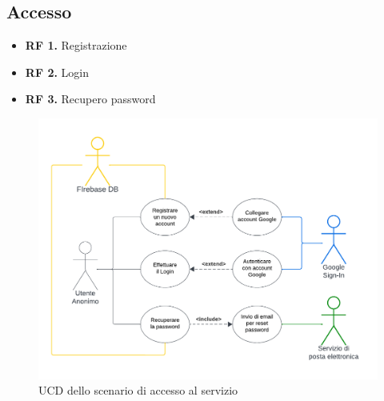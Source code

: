 \documentclass[11pt, a4paper]{article}
\theoremstyle{definition} %
\begin{document}
\subsection{Accesso}
\begin{itemize}
    \item \textbf{RF 1.} Registrazione
    \item \textbf{RF 2.} Login
    \item \textbf{RF 3.} Recupero password
\end{itemize}
\begin{figure}[H]
\centering
\hspace*{-0.7cm}
\includegraphics[scale=0.84]{materiale/ucdiagrams/ucaccesso.pdf}
\caption{UCD dello scenario di accesso al servizio}
\end{figure}
\end{document}
